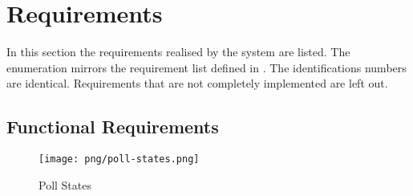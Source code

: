 \section{Requirements}
\label{requirements}



In this section the requirements realised by the system are listed. The enumeration mirrors the requirement list defined in \cite{Votes14}. The identifications numbers are identical. Requirements that are not completely implemented are left out.


\subsection{Functional Requirements}

\begin{figure}
\centering
\texttt{[image: png/poll-states.png]}
\caption{Poll States}
\label{figure:poll-states}
\end{figure}

